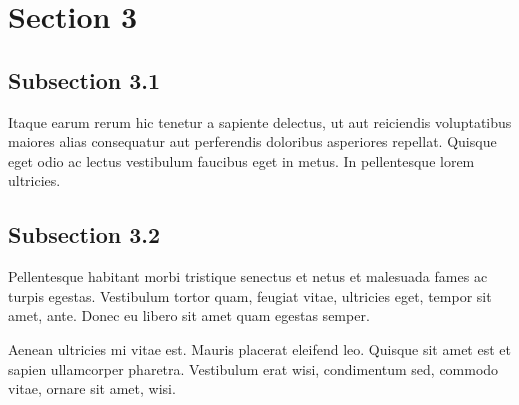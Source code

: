\section{Section 3}

\subsection{Subsection 3.1}

Itaque earum rerum hic tenetur a sapiente delectus, ut aut reiciendis voluptatibus maiores alias consequatur aut perferendis doloribus asperiores repellat. Quisque eget odio ac lectus vestibulum faucibus eget in metus. In pellentesque lorem ultricies.

\subsection{Subsection 3.2}

Pellentesque habitant morbi tristique senectus et netus et malesuada fames ac turpis egestas. Vestibulum tortor quam, feugiat vitae, ultricies eget, tempor sit amet, ante. Donec eu libero sit amet quam egestas semper.

Aenean ultricies mi vitae est. Mauris placerat eleifend leo. Quisque sit amet est et sapien ullamcorper pharetra. Vestibulum erat wisi, condimentum sed, commodo vitae, ornare sit amet, wisi.
